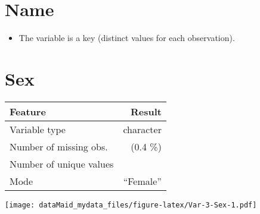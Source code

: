 \documentclass[]{report}
\providecommand{\tightlist}{%
  \setlength{\itemsep}{0pt}\setlength{\parskip}{0pt}}
\begin{document}
\noindent\makebox[\linewidth]{\rule{\textwidth}{0.4pt}}

\hypertarget{name}{%
\section{Name}\label{name}}

\begin{itemize}
\tightlist
\item
  The variable is a key (distinct values for each observation).
\end{itemize}

\noindent\makebox[\linewidth]{\rule{\textwidth}{0.4pt}}

\hypertarget{sex}{%
\section{Sex}\label{sex}}

\begin{minipage}{0.75 \textwidth}

\begin{longtable}[]{@{}lr@{}}
\toprule
\begin{minipage}[b]{0.34\columnwidth}\raggedright
Feature\strut
\end{minipage} & \begin{minipage}[b]{0.16\columnwidth}\raggedleft
Result\strut
\end{minipage}\tabularnewline
\midrule
\endhead
\begin{minipage}[t]{0.34\columnwidth}\raggedright
Variable type\strut
\end{minipage} & \begin{minipage}[t]{0.16\columnwidth}\raggedleft
character\strut
\end{minipage}\tabularnewline
\begin{minipage}[t]{0.34\columnwidth}\raggedright
Number of missing obs.\strut
\end{minipage} & \begin{minipage}[t]{0.16\columnwidth}\raggedleft
1 (0.4 \%)\strut
\end{minipage}\tabularnewline
\begin{minipage}[t]{0.34\columnwidth}\raggedright
Number of unique values\strut
\end{minipage} & \begin{minipage}[t]{0.16\columnwidth}\raggedleft
2\strut
\end{minipage}\tabularnewline
\begin{minipage}[t]{0.34\columnwidth}\raggedright
Mode\strut
\end{minipage} & \begin{minipage}[t]{0.16\columnwidth}\raggedleft
``Female''\strut
\end{minipage}\tabularnewline
\bottomrule
\end{longtable}

\end{minipage}
\begin{minipage}{0.25 \textwidth}

\texttt{[image: dataMaid\_mydata\_files/figure-latex/Var-3-Sex-1.pdf]}

\end{minipage}
\end{document}
